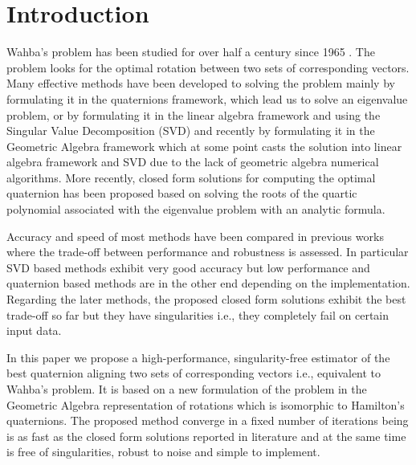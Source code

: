\documentclass{birkjour}
\numberwithin{equation}{section}
\begin{document}
\maketitle
\section{Introduction}

\indent Wahba's problem has been studied for over half a century since 1965 \cite{Wahba1965}. The problem looks for the optimal rotation between two sets of corresponding vectors. Many effective methods have been developed to solving the problem \cite{Arun1987, Horn1987, Mortari1996, Shuster1981, Yang2015} mainly by formulating it in the quaternions framework, which lead us to solve an eigenvalue problem, or by formulating it in the linear algebra framework and using the Singular Value Decomposition (SVD) and recently by formulating it in the Geometric Algebra framework \cite{Perwass2009, Dorst2011} which at some point casts the solution into linear algebra framework and SVD due to the lack of geometric algebra numerical algorithms. More recently, closed form solutions for computing the optimal quaternion has been proposed \cite{Wu2017, Wu2018FA3R, Wu2018FS3R} based on solving the roots of the quartic polynomial associated with the eigenvalue problem with an analytic formula.

Accuracy and speed of most methods have been compared in previous works \cite{Eggert1997,Markley1999, Wu2017} where the trade-off between performance and robustness is assessed. In particular SVD based methods exhibit very good accuracy but low performance and quaternion based methods are in the other end depending on the implementation. Regarding the later methods, the proposed closed form solutions exhibit the best trade-off so far but they have singularities i.e., they completely fail on certain input data.

In this paper we propose a high-performance, singularity-free estimator of the best quaternion aligning two sets of corresponding vectors i.e., equivalent to Wahba's problem. It is based on a new formulation of the problem  in the Geometric Algebra representation of rotations which is isomorphic to Hamilton's quaternions.  The proposed method converge in a fixed number of iterations being is as fast as the closed form solutions reported in literature and at the same time is free of singularities, robust to noise and simple to implement.
\end{document}

